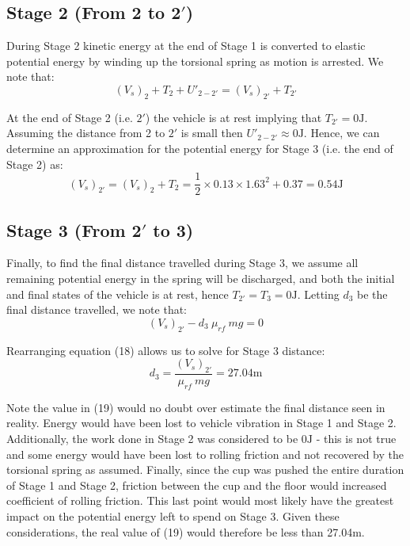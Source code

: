 \documentclass[a4paper]{article}
\begin{document}
\subsection{Stage 2 (From 2 to 2$'$)}
During Stage 2 kinetic energy at the end of Stage 1 is converted to elastic potential energy by winding up the torsional spring as motion is arrested. We note that:
\begin{equation}
	(V_s)_2 + T_2 + U'_{2-2'} = (V_s)_{2'} + T_{2'}
\end{equation}

At the end of Stage 2 (i.e. $2'$) the vehicle is at rest implying that $T_{2'} = 0\si{\joule}$. Assuming the distance from 2 to $2'$ is small then $U'_{2-2'} \approx 0\si{\joule}$. Hence, we can determine an approximation for the potential energy for Stage 3 (i.e. the end of Stage 2) as:
\begin{equation}
	(V_s)_{2'} = (V_s)_2 + T_2 = \frac{1}{2} \times 0.13 \times 1.63^2 + 0.37 = 0.54\si{\joule}
\end{equation}

\subsection{Stage 3 (From 2$'$ to 3)}
Finally, to find the final distance travelled during Stage 3, we assume all remaining potential energy in the spring will be discharged, and both the initial and final states of the vehicle is at rest, hence $T_{2'} = T_3 = 0 \si{\joule}$. Letting $d_3$ be the final distance travelled, we note that:
\begin{equation}
	(V_s)_{2'} - d_3 \ \mu_{rf} \ mg = 0
\end{equation}

Rearranging equation (18) allows us to solve for Stage 3 distance:
\begin{equation}
	d_3 = \frac{(V_s)_{2'}}{\mu_{rf} \ mg} = 27.04\si{\meter}
\end{equation}

Note the value in (19) would no doubt over estimate the final distance seen in reality. Energy would have been lost to vehicle vibration in Stage 1 and Stage 2. Additionally, the work done in Stage 2 was considered to be 0$\si{\joule}$ - this is not true and some energy would have been lost to rolling friction and not recovered by the torsional spring as assumed. Finally, since the cup was pushed the entire duration of Stage 1 and Stage 2, friction between the cup and the floor would increased coefficient of rolling friction. This last point would most likely have the greatest impact on the potential energy left to spend on Stage 3. Given these considerations, the real value of (19) would therefore be less than 27.04$\si{\meter}$.
\end{document}
